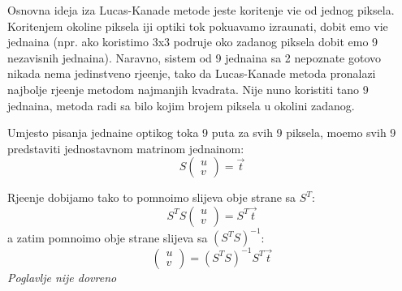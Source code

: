 Osnovna ideja iza Lucas-Kanade metode jeste kori\sh tenje vi\sh e od jednog piksela. Kori\sh tenjem okoline piksela \ch iji opti\ch ki tok poku\sh avamo izra\ch unati, dobit \cj emo vi\sh e jedna\ch ina
(npr. ako koristimo 3x3 podru\ch je oko zadanog piksela dobit \cj emo 9 nezavisnih jedna\ch ina). Naravno, sistem od 9 jedna\ch ina sa 2 nepoznate gotovo nikada nema jedinstveno rje\sh enje,
tako da Lucas-Kanade metoda pronalazi najbolje rje\sh enje metodom najmanjih kvadrata. Nije nu\zh no koristiti ta\ch no 9 jedna\ch ina, metoda radi sa bilo kojim brojem piksela u okolini zadanog.

Umjesto pisanja jedna\ch ine opti\ch kog toka 9 puta za svih 9 piksela, mo\zh emo svih 9 predstaviti jednostavnom matri\ch nom jedna\ch inom:
\[
S
\begin{pmatrix}
u \\
v
\end{pmatrix}
=\vec{t}
\]


Rje\sh enje dobijamo tako \sh to pomno\zh imo slijeva obje strane sa $S^T$:
\[
S^TS\begin{pmatrix}u \\ v\end{pmatrix}=S^T\vec{t}
\]
a zatim pomno\zh imo obje strane slijeva sa $(S^TS)^{-1}$:
\[
\begin{pmatrix}u \\ v\end{pmatrix}=(S^TS)^{-1}S^T\vec{t}
\]
\textit{Poglavlje nije dovr\sh eno}